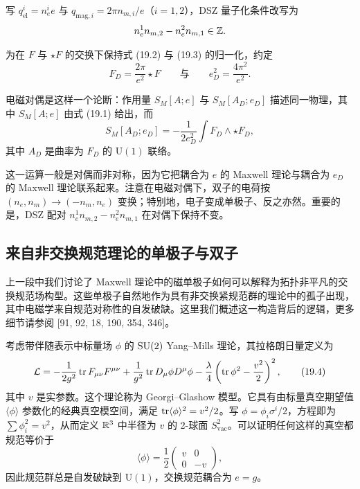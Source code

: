 写 $q_{\mathrm{el}}^i=n_e^i e$ 与 $q_{\mathrm{mag},i}=2\pi n_{m,i}/e$（$i=1,2$），DSZ 量子化条件改写为
\[
n_e^1n_{m,2}-n_e^2n_{m,1}\in\Z .
\]

为在 $F$ 与 $\star F$ 的交换下保持式 (19.2) 与 (19.3) 的归一化，约定
\[
F_D=\frac{2\pi}{e^2}\star F
\qquad\text{与}\qquad
e_D^2=\frac{4\pi^2}{e^2}.
\]

\begin{definition}[19.7]
电磁对偶是这样一个论断：作用量 $S_M[A;e]$ 与 $S_M[A_D;e_D]$ 描述同一物理，其中 $S_M[A;e]$ 由式 (19.1) 给出，而
\[
S_M[A_D;e_D]=-\frac{1}{2e_D^2}\int F_D\wedge\star F_D,
\]
其中 $A_D$ 是曲率为 $F_D$ 的 $\mathrm{U}(1)$ 联络。
\end{definition}


这一运算一般是对偶而非对称，因为它把耦合为 $e$ 的 Maxwell 理论与耦合为 $e_D$ 的 Maxwell 理论联系起来。注意在电磁对偶下，双子的电荷按 $(n_e,n_m)\longrightarrow(-n_m,n_e)$ 变换；特别地，电子变成单极子、反之亦然。重要的是，DSZ 配对 $n_e^1n_{m,2}-n_e^2n_{m,1}$ 在对偶下保持不变。

\subsection{来自非交换规范理论的单极子与双子}

上一段中我们讨论了 Maxwell 理论中的磁单极子如何可以解释为拓扑非平凡的交换规范场构型。这些单极子自然地作为具有非交换紧规范群的理论中的孤子出现，其中电磁学来自规范对称性的自发破缺。这里我们概述这一构造背后的逻辑，更多细节请参阅 [91, 92, 18, 190, 354, 346]。

考虑带伴随表示中标量场 $\phi$ 的 $\SU(2)$ Yang--Mills 理论，其拉格朗日量定义为
\begin{equation}
\mathcal{L}=-\frac{1}{2g^2}\tr F_{\mu\nu}F^{\mu\nu}
+\frac{1}{g^2}\tr D_\mu\phi D^\mu\phi
-\frac{\lambda}{4}\left(\tr\phi^2-\frac{v^2}{2}\right)^2, \tag{19.4}
\end{equation}
其中 $v$ 是实参数。这个理论称为 Georgi--Glashow 模型。它具有由标量真空期望值 $\langle\phi\rangle$ 参数化的经典真空模空间，满足 $\tr\langle\phi\rangle^2=v^2/2$。写 $\phi=\phi_i\sigma^i/2$，方程即为 $\sum\phi_i^2=v^2$，从而定义 $\R^3$ 中半径为 $v$ 的 2-球面 $S^2_{\mathrm{vac}}$。可以证明任何这样的真空都规范等价于
\[
\langle\phi\rangle=\frac{1}{2}\begin{pmatrix} v & 0\\ 0 & -v\end{pmatrix},
\]
因此规范群总是自发破缺到 $\mathrm{U}(1)$，交换规范耦合为 $e=g$。

